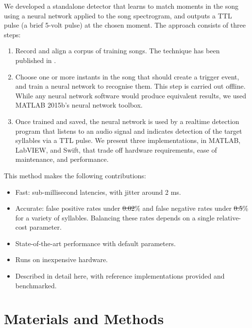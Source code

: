 \documentclass[10pt,letterpaper]{article}
\providecommand{\DIFaddtex}[1]{{\protect\color{blue}\uwave{#1}}} %
\providecommand{\DIFdeltex}[1]{{\protect\color{red}\sout{#1}}}                      %
\providecommand{\DIFaddbegin}{} %
\providecommand{\DIFaddend}{} %
\providecommand{\DIFdelbegin}{} %
\providecommand{\DIFdelend}{} %
\providecommand{\DIFadd}[1]{\texorpdfstring{\DIFaddtex{#1}}{#1}} %
\providecommand{\DIFdel}[1]{\texorpdfstring{\DIFdeltex{#1}}{}} %
\begin{document}
We developed a standalone detector that learns to match moments in the
song using a neural network applied to the song spectrogram, and
outputs a TTL pulse (a brief 5-volt pulse) at the chosen moment. The
approach consists of three steps:

 \begin{enumerate} 
\item Record and align a corpus of training songs.  The technique has been published in \cite{Poole2012}.
\item Choose one or more instants in the song that should create a trigger event, and train a
  neural network to recognise them. This step is carried out offline.  While any neural network software would produce equivalent results, we used MATLAB 2015b's neural network toolbox.
\item Once trained and saved, the neural network is used by a realtime
  detection program that listens to an audio signal and indicates detection of the target
  syllables via a TTL pulse.  We present three implementations, in MATLAB, LabVIEW, and Swift, that trade off hardware requirements, ease of maintenance, and performance.
 \end{enumerate} 
This method makes the following contributions:
 \begin{itemize} 
\item Fast: sub-millisecond latencies, with jitter around 2 ms.
\item Accurate: false positive rates under \DIFdelbegin \DIFdel{0.02}\DIFdelend \DIFaddbegin \DIFadd{0.001}\DIFaddend \% and false negative rates under \DIFdelbegin \DIFdel{0.5}\DIFdelend \DIFaddbegin \DIFadd{1}\DIFaddend \% for a variety of syllables.  Balancing these rates depends on a single relative-cost parameter.
\item State-of-the-art performance with default parameters.
\item Runs on inexpensive hardware.
\item Described in detail here, with reference implementations provided and benchmarked.
 \end{itemize} 



\section{Materials and Methods}
\label{sec:method}
\end{document}
